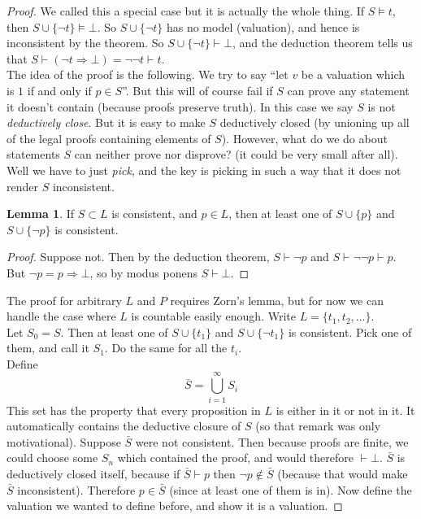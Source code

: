 \documentclass{article}
\theoremstyle{definition}
\newtheorem{lemma}{Lemma}
\numberwithin{definition}{section}
\newcommand{\entails}{\models}
\newcommand{\proves}{\vdash}
\begin{document}
\begin{proof}
We called this a special case but it is actually the whole thing. If $S \entails t$, then $S \cup \{\neg t\} \entails \bot$. So $S \cup \{\neg t\}$ has no model (valuation), and hence is inconsistent by the theorem. So $S \cup \{\neg t\} \proves \bot$, and the deduction theorem tells us that $S \proves (\neg t \Rightarrow \bot) = \neg \neg t \proves t$. \\
The idea of the proof is the following. We try to say ``let $v$ be a valuation which is $1$ if and only if $p \in S$''. But this will of course fail if $S$ can prove any statement it doesn't contain (because proofs preserve truth). In this case we say $S$ is not \textit{deductively close}. But it is easy to make $S$ deductively closed (by unioning up all of the legal proofs containing elements of $S$). However, what do we do about statements $S$ can neither prove nor disprove? (it could be very small after all). Well we have to just \textit{pick}, and the key is picking in such a way that it does not render $S$ inconsistent. 
\begin{lemma}
If $S \subset L$ is consistent, and $p \in L$, then at least one of $S \cup \{p\}$ and $S \cup \{\neg p\}$ is consistent. 
\end{lemma} 
\begin{proof}
Suppose not. Then by the deduction theorem, $S \proves \neg p$ and $S \proves \neg \neg p \proves p$. But $\neg p = p \Rightarrow \bot$, so by modus ponens $S \proves \bot$. 
\end{proof}
The proof for arbitrary $L$ and $P$ requires Zorn's lemma, but for now we can handle the case where $L$ is countable easily enough. Write $L = \{t_{1},t_{2},\ldots\}$. \\
Let $S_{0} = S$. Then at least one of $S \cup \{t_{1}\}$ and $S \cup \{\neg t_{1}\}$ is consistent. Pick one of them, and call it $S_{1}$. Do the same for all the $t_{i}$. \\
Define $$\bar{S} = \bigcup_{i=1}^{\infty} S_{i}$$
This set has the property that every proposition in $L$ is either in it or not in it. It automatically contains the deductive closure of $S$ (so that remark was only motivational). Suppose $\bar{S}$ were not consistent. Then because proofs are finite, we could choose some $S_{n}$ which contained the proof, and would therefore $\proves \bot$. $\bar{S}$ is deductively closed itself, because if $\bar{S} \proves p$ then $\neg p \notin \bar{S}$ (because that would make $\bar{S}$ inconsistent). Therefore $p \in \bar{S}$ (since at least one of them is in). Now define the valuation we wanted to define before, and show it is a valuation. 
\end{proof}
\end{document}

